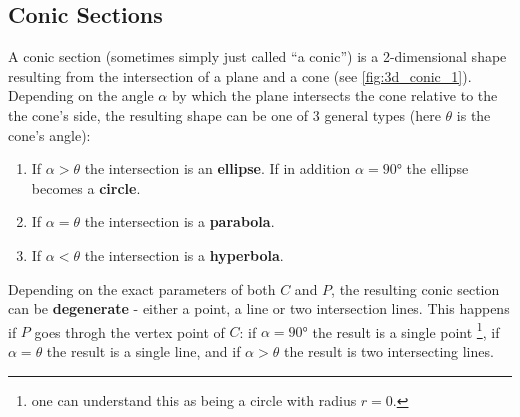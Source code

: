 \subsection{Conic Sections}
A conic section (sometimes simply just called \enquote{a conic}) is a 2-dimensional shape resulting from the intersection of a plane and a cone (see \autoref{fig:3d_conic_1}). Depending on the angle $\alpha$ by which the plane intersects the cone relative to the the cone's side, the resulting shape can be one of 3 general types (here $\theta$ is the cone's angle):
\begin{enumerate}
  \item If $\alpha>\theta$ the intersection is an \textbf{ellipse}. If in addition $\alpha=\ang{90}$ the ellipse becomes a \textbf{circle}.
  \item If $\alpha=\theta$ the intersection is a \textbf{parabola}.
  \item If $\alpha<\theta$ the intersection is a \textbf{hyperbola}.
\end{enumerate}

Depending on the exact parameters of both $C$ and $P$, the resulting conic section can be \textbf{degenerate} - either a point, a line or two intersection lines. This happens if $P$ goes throgh the vertex point of $C$: if $\alpha=\ang{90}$ the result is a single point \footnote{one can understand this as being a circle with radius $r=0$.}, if $\alpha=\theta$ the result is a single line, and if $\alpha>\theta$ the result is two intersecting lines.

